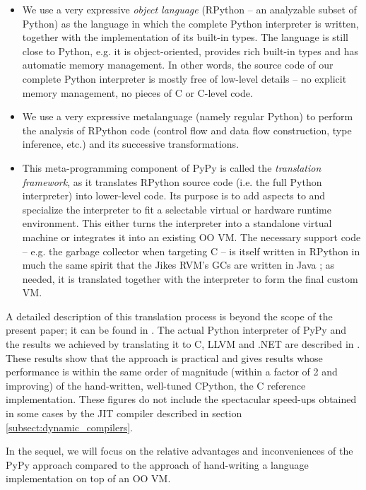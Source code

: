 \documentclass{llncs}
\begin{document}
\begin{itemize}

\item
We use a very expressive \emph{object language} (RPython -- an analyzable
subset of Python) as the language in which the complete Python
interpreter is written, together with the implementation of its
built-in types.  The language is still close to Python, e.g.  it is
object-oriented, provides rich built-in types and has automatic memory
management.  In other words, the source code of our complete Python
interpreter is mostly free of low-level details -- no explicit memory
management, no pieces of C or C-level code.

\item
We use a very expressive metalanguage (namely regular Python) to
perform the analysis of RPython code (control flow and data flow
construction, type inference, etc.) and its successive
transformations.

\item
This meta-programming component of PyPy is called the \emph{translation
framework}, as it translates RPython source code (i.e. the full Python
interpreter) into lower-level code.  Its purpose is to add aspects to
and specialize the interpreter to fit a selectable virtual or hardware
runtime environment.  This either turns the interpreter into a
standalone virtual machine or integrates it into an existing OO VM.
The necessary support code -- e.g. the garbage collector when
targeting C -- is itself written in RPython in much the same spirit
that the Jikes RVM's GCs are written in Java \cite{JikesGC}; as needed, it is
translated together with the interpreter to form the final custom VM.
\end{itemize}

A detailed description of this translation process is beyond the scope of the
present paper; it can be found in \cite{pypyvmconstruction}.  The actual Python
interpreter of PyPy and the results we achieved by translating it to C, LLVM
\cite{LLVM} and .NET are described in \cite{architecture} \cite{translationdoc}.
These results show that the
approach is practical and gives results whose performance is within the same
order of magnitude (within a factor of 2 and improving) of the hand-written,
well-tuned CPython, the C reference implementation.  These figures do not
include the spectacular speed-ups obtained in some cases by the JIT compiler
described in section \ref{subsect:dynamic_compilers}.

In the sequel, we will focus on the relative advantages and
inconveniences of the PyPy approach compared to the approach of
hand-writing a language implementation on top of an OO VM.
\end{document}
